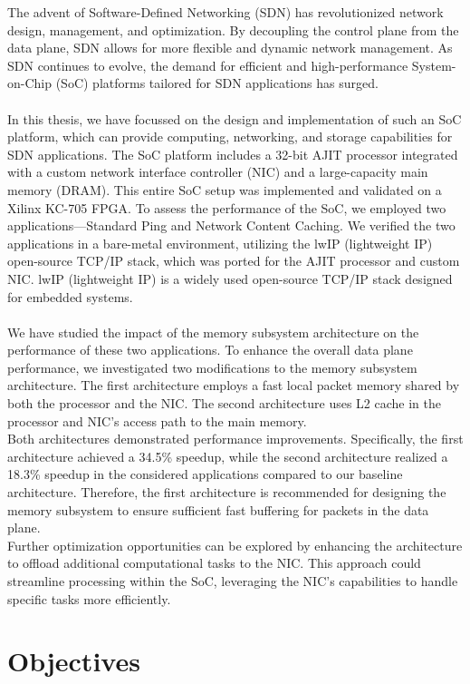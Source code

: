\documentclass[12pt]{report}
\begin{document}
The advent of Software-Defined Networking (SDN) has revolutionized network design, management, and optimization. By decoupling the control plane from the data plane, SDN allows for more flexible and dynamic network management. As SDN continues to evolve, the demand for efficient and high-performance System-on-Chip (SoC) platforms tailored for SDN applications has surged. \\ \\
In this thesis, we have focussed on the design and implementation of such an SoC platform, which can provide computing, networking, and storage capabilities for SDN applications. The SoC platform includes a 32-bit AJIT processor integrated with a custom network interface controller (NIC) and a large-capacity main memory (DRAM). This entire SoC setup was implemented and validated on a Xilinx KC-705 FPGA. To assess the performance of the SoC, we employed two applications—Standard Ping and Network Content Caching. We verified the two applications in a bare-metal environment, utilizing the lwIP (lightweight IP) open-source TCP/IP stack, which was ported for the AJIT processor and custom NIC. 
lwIP (lightweight IP) is a widely used open-source TCP/IP stack designed for embedded systems. \\ \\
\newpage
We have studied the impact of the memory subsystem architecture on the performance of these two applications. To enhance the overall data plane performance, we investigated two modifications to the memory subsystem architecture.
The first architecture employs a fast local packet memory shared by both the processor and the NIC. The second architecture uses L2 cache in the processor and NIC's access path to the main memory. \\ 
Both architectures demonstrated performance improvements. Specifically, the first architecture achieved a 34.5\% speedup, while the second architecture realized a 18.3\% speedup in the considered applications compared to our baseline architecture. Therefore, the first architecture is recommended for designing the memory subsystem to ensure sufficient fast buffering for packets in the data plane. \\ 
Further optimization opportunities can be explored by enhancing the architecture to offload additional computational tasks to the NIC. This approach could streamline processing within the SoC, leveraging the NIC's capabilities to handle specific tasks more efficiently.

\section{Objectives}
\end{document}
